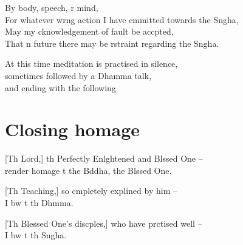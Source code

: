
By body, speech, r mind,\\
For whatever wrng action I have cmmitted towards the Sngha,\\
May my cknowledgement of fault be accpted,\\
That n future there may be rstraint regarding the Sngha.

\begin{instruction}
  At this time meditation is practised in silence,\\
  sometimes followed by a Dhamma talk,\\
  and ending with the following
\end{instruction}

\chapter{Closing homage}%

[Th Lord,] th Perfectly Enlghtened and Blssed One --\\
 render homage t the Bddha, the Blssed One. 

[Th Teaching,] so cmpletely explined by him --\\
I bw t th Dhmma. 

[Th Blessed One's discples,] who have prctised well --\\
I bw t th Sngha. 


